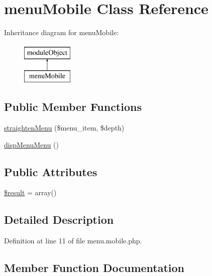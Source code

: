 \hypertarget{classmenuMobile}{}\section{menu\+Mobile Class Reference}
\label{classmenuMobile}
Inheritance diagram for menu\+Mobile\+:\begin{figure}[H]
\begin{center}
\leavevmode
\includegraphics[height=2.000000cm]{classmenuMobile}
\end{center}
\end{figure}
\subsection*{Public Member Functions}
\begin{DoxyCompactItemize}
\item 
\hyperlink{classmenuMobile_aba6cbdcf9a47990ae13d8ae647fd0d2f}{straighten\+Menu} (\$menu\+\_\+item, \$depth)
\item 
\hyperlink{classmenuMobile_a75e49bf960ee60abeb24923cc0f63087}{disp\+Menu\+Menu} ()
\end{DoxyCompactItemize}
\subsection*{Public Attributes}
\begin{DoxyCompactItemize}
\item 
\hyperlink{classmenuMobile_a35fcf2f0b0eb7fc94fa7f0abc36828cd}{\$result} = array()
\end{DoxyCompactItemize}


\subsection{Detailed Description}


Definition at line 11 of file menu.\+mobile.\+php.



\subsection{Member Function Documentation}
\mbox{\label{classmenuMobile_a75e49bf960ee60abeb24923cc0f63087}} 

